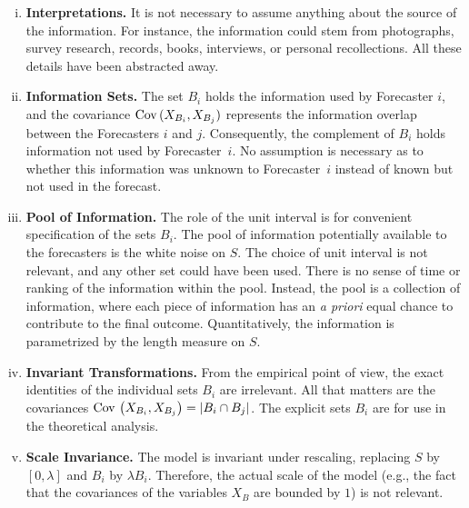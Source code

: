 \documentclass[11pt]{article}
\theoremstyle{definition}
\theoremstyle{definition}
\def\Cov{{\rm Cov}\,}
\begin{document}
\begin{enumerate}[(i)]
\item {\bf Interpretations.} It is not necessary to assume anything 
about the source of the information.  For instance, the information 
could stem from photographs, survey research, records, books, 
interviews, or personal recollections.  All these details have 
been abstracted away.

\item {\bf Information Sets.} The set $B_i$ holds the information used by Forecaster $i$, and the covariance  $\Cov (X_{B_i} , X_{B_j})$ represents the information overlap between the Forecasters $i$ and $j$. 
Consequently, the complement of $B_i$ holds 
information not used by Forecaster~$i$.  No assumption is necessary
as to whether this information was unknown to Forecaster~$i$ instead of
known but not used in the forecast.


\item {\bf Pool of Information.} The role of the unit interval is for convenient 
specification of the sets $B_i$. The pool of information potentially
available to the forecasters is the white noise on $S$. The choice of unit interval is not relevant, and any other set could have been used. There is
no sense of time or ranking of the information within the pool. Instead,
the pool is a collection of information, where each piece of information
has an {\em a priori} equal chance to contribute to the final outcome.
Quantitatively, the information is parametrized by the length measure on $S$.


\item {\bf Invariant Transformations.}  From the empirical point of view, the exact identities of the individual 
sets $B_i$ are irrelevant.  All that matters are the covariances $\Cov \left(X_{B_i} , X_{B_j}\right)  
= |B_i \cap B_j|$.  The explicit sets $B_i$ are for use in the theoretical
analysis.

\item {\bf Scale Invariance.} The model is invariant under rescaling, replacing $S$
by $[0,\lambda]$ and $B_i$ by $\lambda B_i$.  Therefore, the
actual scale of the model (e.g., the fact that the covariances of 
the variables $X_B$ are bounded by $1$) is not relevant. 



\end{enumerate}
\end{document}
